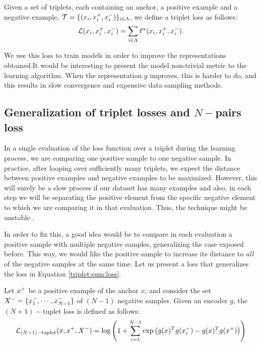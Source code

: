 \begin{ndef}
Given a set of triplets, each containing an anchor, a positive example and a negative example, $\mathcal T = \{(x_i,x^+_i,x^-_i)\}_{i \in \Lambda}$, we define a triplet loss as follows:
\begin{equation}\label{triplet:sum:loss}
\mathcal L (x_i,x^+_i,x^-_i) = \sum_{i \in \Lambda} \ell^\alpha(x_i,x^+_i,x^-_i).
\end{equation}

\end{ndef}



We use this loss to train models in order to improve the representations obtained.It would be interesting to present the model non-trivial metric to the learning algorithm. When the representation $g$ improves, this is harder to do, and this results in slow convergence and expensive data sampling methods.

\subsection*{Generalization of triplet losses and $N-$pairs loss}

In a single evaluation of the loss function over a triplet during the learning process, we are comparing one positive sample to one negative sample. In practice, after looping over sufficiently many triplets, we expect the distance between positive examples and negative examples to be maximized. However, this will surely be a slow process if our dataset has many examples and also, in each step we will be separating the positive element from the specific negative element to which we are comparing it in that evaluation. Thus, the technique might be unstable \citep{Sohn2016ImprovedDM}.

In order to fix this, a good idea would be to compare in each evaluation a positive sample with multiple negative samples, generalizing the case exposed before. This way, we would like the positive sample to increase its distance to \emph{all} of the negative samples at the same time. Let us present a loss that generalizes the loss in Equation \eqref{triplet:sum:loss}.

\begin{ndef}
Let $x^+$ be a positive example of the anchor $x$, and consider the set $X^- = \{x^-_1,\cdots,x^-_{N-1}\}$ of $(N-1)$ negative samples. Given an encoder $g$, the $(N+1)-$tuplet loss is defined as follows:
\begin{equation}\label{nplus1:tuplet:loss}
\mathcal L_{(N+1)-\text{tuplet}}(x,x^+,X^-) = \log \left( 1+ \sum_{i=1}^{N-1} \exp \left(g(x)^T g(x^-_i) - g(x)^T g(x^+)\right)\right) 
\end{equation}
\end{ndef}

